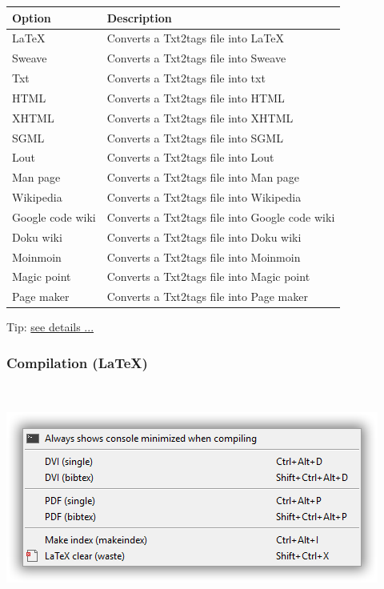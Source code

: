 \begin{scriptsize}
  \begin{tabularx}{\textwidth}{>{\hsize=0.3\hsize}X>{\hsize=0.7\hsize}X}\\
    \hline
    \textbf{Option} & \textbf{Description} \\
    \hline
    \LaTeX & Converts a Txt2tags file into \LaTeX \\
    Sweave & Converts a Txt2tags file into Sweave \\
    Txt & Converts a Txt2tags file into txt \\
    HTML & Converts a Txt2tags file into HTML \\
    XHTML & Converts a Txt2tags file into XHTML \\
    SGML & Converts a Txt2tags file into SGML \\
    Lout & Converts a Txt2tags file into Lout \\
    Man page & Converts a Txt2tags file into Man page \\
    Wikipedia & Converts a Txt2tags file into Wikipedia \\
    Google code wiki & Converts a Txt2tags file into Google code wiki \\
    Doku wiki & Converts a Txt2tags file into Doku wiki \\
    Moinmoin & Converts a Txt2tags file into Moinmoin \\
    Magic point & Converts a Txt2tags file into Magic point \\
    Page maker & Converts a Txt2tags file into Page maker \\
    \hline
  \end{tabularx}
\end{scriptsize}

Tip: \href{http://txt2tags.sourceforge.net/}{see details ...}


\hypertarget{menu_tools_processing_conversion_compilation}{}
\subsubsection{Compilation (\LaTeX)}\\

\includegraphics[scale=0.50]{./res/menu_tools_processing_compilation.png}\\

